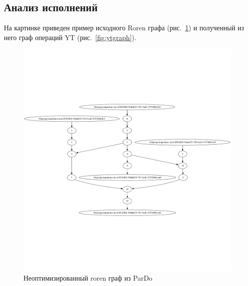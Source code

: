\subsection{Анализ исполнений}

На картинке приведен пример исходного Roren графа (рис.~\ref{fig:roren1}) и полученный из него граф операций YT (рис.~\ref{fig:ytgraph}).

\begin{figure}[h]
    \centering
    \includegraphics[width=\textwidth]{img/roren1.png}
    \caption{Неоптимизированный roren граф из ParDo}
    \label{fig:roren1}
\end{figure}

